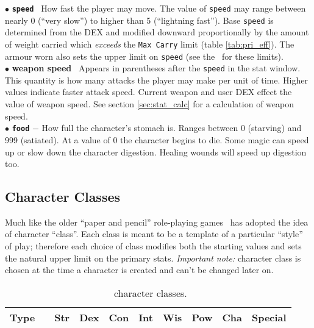 $\bullet$ {\bf\tt speed} \emdash\
How fast the player may move. 
The value of {\tt speed} may range between nearly 0 (``very slow'') to 
higher than 5 
(``lightning fast''). Base {\tt speed} is determined from the DEX and modified 
downward proportionally by the amount of weight carried which {\em exceeds} the 
{\tt Max Carry} limit (table \ref{tab:pri_eff}). The armour worn also sets the 
upper limit on {\tt speed} (see the \spoiler\ for these limits). \\

$\bullet$ {\bf weapon speed} 
\emdash\ Appears in 
parentheses after the {\tt speed} in the stat window. This quantity is
how many attacks the player may make per unit of time. 
Higher values indicate faster attack speed. Current weapon and user 
DEX effect the value of weapon speed. See section \ref{sec:stat_calc} 
for a calculation of weapon speed. \\

$\bullet$ {\bf\tt food} $-$ How full the character's stomach is. 
Ranges between 0 (starving) and 999 (satiated).  At a value of 0 the 
character begins to die. Some magic can speed up or slow down the 
character digestion. Healing wounds will speed up digestion too. \\
 

\subsection{Character Classes}\label{sec:char_cls} 

Much like the older ``paper and pencil'' role-playing games 
\cf\ has adopted the idea of character ``class''. 
Each class is meant to be a template of a particular ``style'' of play; 
therefore each choice of class modifies both the starting 
values and sets the natural upper limit on the primary stats. 
{\em Important note:} character class is chosen at the time a 
character is created and can't be changed later on.
\begin{table}
\begin{center}
\scriptsize
\caption{\cf\ character classes. \label{tab:char_cls}}
\vskip 12pt
\begin{tabular}{|c|c|l|l|l|l|l|l|l|p{4cm}|}
\hline
Type& &         Str&    Dex&    Con&    Int&    Wis&    Pow& Cha & Special\\
\hline
\hline

\hline
\end{tabular}
\end{center}
\end{table}

